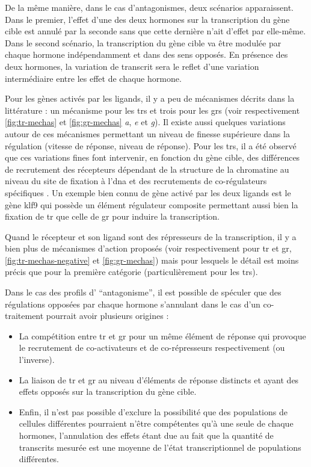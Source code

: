 \documentclass[../main.tex]{subfiles}
\begin{document}
	De la même manière, dans le cas d'antagonismes, deux scénarios apparaissent.
	Dans le premier, l'effet d'une des deux hormones sur la transcription du gène cible est annulé par la seconde sans que cette dernière n'ait d'effet par elle-même.
	Dans le second scénario, la transcription du gène cible va être modulée par chaque hormone indépendamment et dans des sens opposés.
	En présence des deux hormones, la variation de transcrit sera le reflet d'une variation intermédiaire entre les effet de chaque hormone.
	\par
	Pour les gènes activés par les ligands, il y a peu de mécanismes décrits dans la littérature :
	un mécanisme pour les \glspl{tr} et trois pour les \glspl{gr} (voir respectivement \autoref{fig:tr-mechas} et \autoref{fig:gr-mechas} \textit{a}, \textit{e} et \textit{g}).
	Il existe aussi quelques variations autour de ces mécanismes permettant un niveau de finesse supérieure dans la régulation (vitesse de réponse, niveau de réponse).
	Pour les \glspl{tr}, il a été observé que ces variations fines font intervenir, en fonction du gène cible, des différences de recrutement des récepteurs dépendant de la structure de la chromatine au niveau du site de fixation à l'\gls{dna} \citep{Bilesimo2011} et des recrutements de co-régulateurs spécifiques \citep{Havis2003}.
	Un exemple bien connu de gène activé par les deux ligands est le gène \gls{klf9} qui possède un élément régulateur composite permettant aussi bien la fixation de \gls{tr} que celle de \gls{gr} pour induire la transcription.
	\par
	Quand le récepteur et son ligand sont des répresseurs de la transcription, il y a bien plus de mécanismes d'action proposés (voir respectivement pour \gls{tr} et \gls{gr}, \autoref{fig:tr-mechas-negative} et \autoref{fig:gr-mechas}) mais pour lesquels le détail est moins précis que pour la première catégorie (particulièrement pour les \glspl{tr}).
	\par
	Dans le cas des profils d' ``antagonisme'', il est possible de spéculer que des régulations opposées par chaque hormone s'annulant dans le cas d'un co-traitement pourrait avoir plusieurs origines :
	\begin{itemize}
		\item
			La compétition entre \gls{tr} et \gls{gr} pour un même élément de réponse qui provoque le recrutement de co-activateurs et de co-répresseurs respectivement (ou l'inverse).
		\item
			La liaison de \gls{tr} et \gls{gr} au niveau d'éléments de réponse distincts et ayant des effets opposés sur la transcription du gène cible.
		\item
			Enfin, il n'est pas possible d'exclure la possibilité que des populations de cellules différentes pourraient n'être compétentes qu'à une seule de chaque hormones, l'annulation des effets étant due au fait que la quantité de transcrits mesurée est une moyenne de l'état transcriptionnel de populations différentes.
	\end{itemize}
\end{document}

